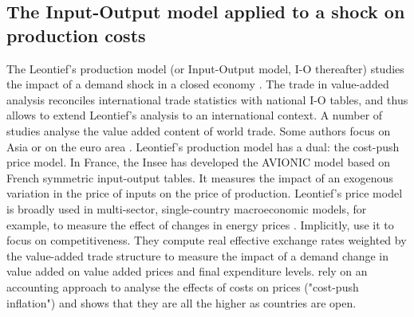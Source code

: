 \documentclass[12pt,a4paper]{paper}
\begin{document}
\subsection{The Input-Output model applied to a shock on production costs} 
\label{subsec:io}
The Leontief's production model (or Input-Output model, I-O thereafter) studies the impact of a demand shock in a closed economy \citep{Leontief1951}. 
The trade in value-added analysis reconciles international trade statistics with national I-O tables, and thus allows to extend Leontief's analysis to an international context.
A number of studies \citep{Hummels2001,Daudin2006,Daudin2011, DeBacker2012,Johnson2012,Koopman2014, Amador2015,Los2016,Miroudot2020} analyse the value added content of world trade. Some authors focus on Asia \citep{Sato2014} or on the euro area \citep{Cappariello2015}.
Leontief's production model has a dual: the cost-push price model.
In France, the Insee \citep{Bourgeois2019} has developed the AVIONIC model based on French symmetric input-output tables. 
It measures the impact of an exogenous variation in the price of inputs on the price of production.
Leontief's price model is broadly used in multi-sector, single-country macroeconomic models, for example, to measure the effect of changes in energy prices \citep{Bournay2015, Sharify2013}. Implicitly, \cite{Bems2015} use it to focus on competitiveness. 
They compute real effective exchange rates weighted by the value-added trade structure to measure the impact of a demand change in value added on value added prices and final expenditure levels. %
\cite{Cochard2016} rely on an accounting approach to analyse the effects of costs on prices ("cost-push inflation") and shows that they are all the higher as countries are open.
\end{document}
